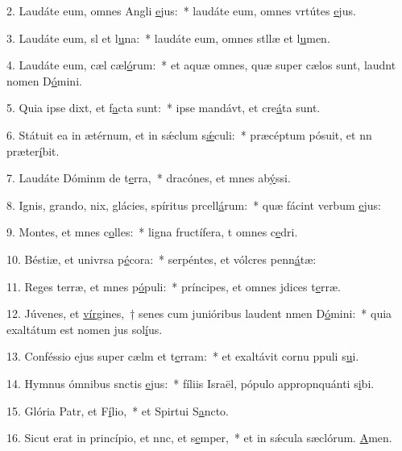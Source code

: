 2. Laudáte eum, omnes Angli \uline{e}jus:~* laudáte eum, omnes vrtútes \uline{e}jus.\par 
3. Laudáte eum, sl et l\uline{u}na:~* laudáte eum, omnes stllæ et l\uline{u}men.\par 
4. Laudáte eum, cæl cæl\uline{ó}rum:~* et aquæ omnes, quæ super cælos sunt, laudnt nomen D\uline{ó}mini.\par 
5. Quia ipse dixt, et f\uline{a}cta sunt:~* ipse mandávt, et cre\uline{á}ta sunt.\par 
6. Státuit ea in ætérnum, et in sǽclum s\uline{ǽ}culi:~* præcéptum pósuit, et nn præter\uline{í}bit.\par 
7. Laudáte Dóminm de t\uline{e}rra,~* dracónes, et mnes ab\uline{ý}ssi.\par 
8. Ignis, grando, nix, glácies, spíritus prcell\uline{á}rum:~* quæ fácint verbum \uline{e}jus:\par 
9. Montes, et mnes c\uline{o}lles:~* ligna fructífera, t omnes c\uline{e}dri.\par 
10. Béstiæ, et univrsa p\uline{é}cora:~* serpéntes, et vólcres penn\uline{á}tæ:\par 
11. Reges terræ, et mnes p\uline{ó}puli:~* príncipes, et omnes jdices t\uline{e}rræ.\par 
12. Júvenes, et \uline{vír}gines,~† senes cum junióribus laudent nmen D\uline{ó}mini:~* quia exaltátum est nomen jus sol\uline{í}us.\par 
13. Conféssio ejus super cælm et t\uline{e}rram:~* et exaltávit cornu ppuli s\uline{u}i.\par 
14. Hymnus ómnibus snctis \uline{e}jus:~* fíliis Israël, pópulo appropnquánti s\uline{i}bi.\par 
15. Glória Patr, et F\uline{í}lio,~* et Spirtui S\uline{a}ncto.\par 
16. Sicut erat in princípio, et nnc, et s\uline{e}mper,~* et in sǽcula sæclórum. \uline{A}men.\par 
